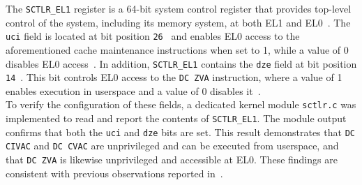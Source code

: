         The \texttt{SCTLR\_EL1} register is a 64-bit system control register that provides top-level control of the system, 
        including its memory system, at both EL1 and EL0~\cite{docSCTLREL1, docCortexA72}. The \texttt{\gls{uci}} field is located at bit position \texttt{26}~\cite{docSCTLREL1, docSystemControlRegister} 
        and enables EL0 access to the aforementioned cache maintenance instructions when set to 1, while a value of 
        0 disables EL0 access~\cite{docSystemControlRegister}. In addition, \texttt{SCTLR\_EL1} contains the \texttt{\gls{dze}} field at bit 
        position \texttt{14}~\cite{docSCTLREL1, docSystemControlRegister}. This bit controls EL0 access to the \texttt{DC ZVA} instruction, where a value of 1 enables 
        execution in userspace and a value of 0 disables it~\cite{docSystemControlRegister}.
        \\
        To verify the configuration of these fields, a dedicated kernel module \texttt{sctlr.c} was implemented to read 
        and report the contents of \texttt{SCTLR\_EL1}. The module output confirms that both the \texttt{\gls{uci}} and \texttt{\gls{dze}} bits are set. 
        This result demonstrates that \texttt{DC CIVAC} and \texttt{DC CVAC} are unprivileged and can be executed from userspace, 
        and that \texttt{DC ZVA} is likewise unprivileged and accessible at EL0. These findings are consistent with previous 
        observations reported in~\cite{paperTriggeringRHHardwareFault}.
    
